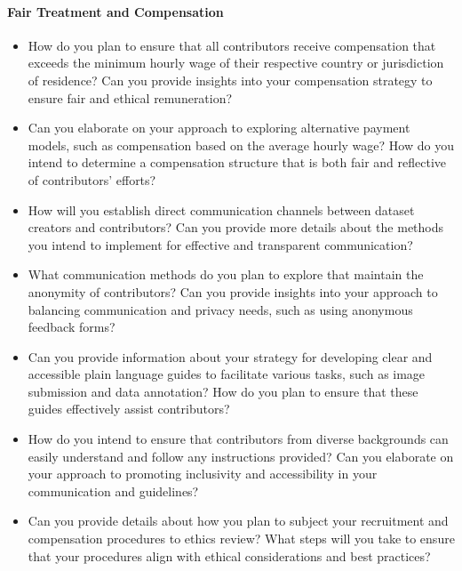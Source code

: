 \paragraph{Fair Treatment and Compensation}
\begin{itemize}
  \item How do you plan to ensure that all contributors receive compensation that
  exceeds the minimum hourly wage of their respective country or jurisdiction of
  residence? Can you provide insights into your compensation strategy to ensure fair
  and ethical remuneration?
  \item Can you elaborate on your approach to exploring alternative payment models,
  such as compensation based on the average hourly wage? How do you intend to determine
  a compensation structure that is both fair and reflective of contributors' efforts?
  \item How will you establish direct communication channels between dataset creators
  and contributors? Can you provide more details about the methods you intend to
  implement for effective and transparent communication?
  \item What communication methods do you plan to explore that maintain the anonymity
  of contributors? Can you provide insights into your approach to balancing communication
  and privacy needs, such as using anonymous feedback forms?
  \item Can you provide information about your strategy for developing clear and
  accessible plain language guides to facilitate various tasks, such as image submission
  and data annotation? How do you plan to ensure that these guides effectively assist
  contributors?
  \item How do you intend to ensure that contributors from diverse backgrounds can easily
  understand and follow any instructions provided? Can you elaborate on your approach to
  promoting inclusivity and accessibility in your communication and guidelines?
  \item Can you provide details about how you plan to subject your recruitment and
  compensation procedures to ethics review? What steps will you take to ensure that
  your procedures align with ethical considerations and best practices?
\end{itemize}
